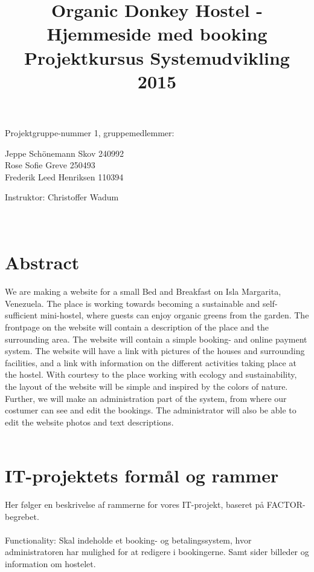 \documentclass[12pt,a4paper]{article}
\begin{document}
\title{Organic Donkey Hostel - Hjemmeside med booking\\
Projektkursus Systemudvikling 2015}
\maketitle
\begin{center}
Projektgruppe-nummer 1, gruppemedlemmer:
\end{center}
\begin{center}
Jeppe Schönemann Skov 240992\\
Rose Sofie Greve 250493\\
Frederik Leed Henriksen 110394\\
\end{center}
\begin{center}
Instruktor: Christoffer Wadum\\ \hfill \\ \hfill \\ 
\end{center}
\newpage
\tableofcontents
\newpage
\section{Abstract}
We are making a website for a small Bed and Breakfast on Isla Margarita, Venezuela. The place is working towards becoming a sustainable and self-sufficient mini-hostel, where guests can enjoy organic greens from the garden.
The frontpage on the website will contain a description of the place and the surrounding area.
The website will contain a simple booking- and online payment system.
The website will have a link with pictures of the houses and surrounding facilities, and a link with information on the different activities taking place at the hostel.
With courtesy to the place working with ecology and sustainability, the layout of the website will be simple and inspired by the colors of nature.
Further, we will make an administration part of the system, from where our costumer can see and edit the bookings. The administrator will also be able to edit the website photos and text descriptions. \\\\
\newpage
\section{IT-projektets formål og rammer}
Her følger en beskrivelse af rammerne for vores IT-projekt, baseret på FACTOR-begrebet.
\\\\
Functionality: Skal indeholde et booking- og betalingssystem, hvor administratoren har mulighed for at redigere i bookingerne. Samt sider billeder og information om hostelet. \\
\end{document}
